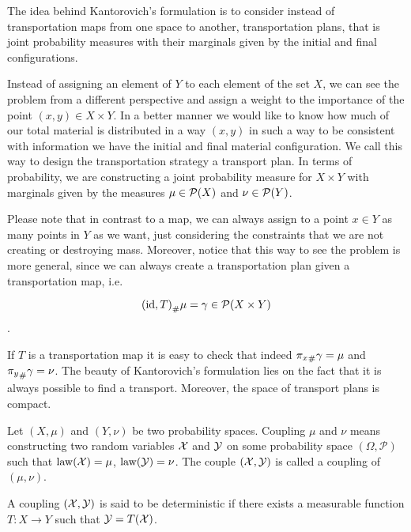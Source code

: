 The idea behind Kantorovich's formulation is to consider instead of transportation maps from one space to another, transportation plans, that is joint probability measures with their marginals given by the initial and final configurations.

Instead of assigning an element of $Y$ to each element of the set $X$, we can see the problem from a different perspective and assign a weight to the importance of the point $\left(x, y\right)\in X\times Y$. In a better manner we would like to know how much of our total material is distributed in a way $(x, y)$ in such a way to be consistent with information we have the initial and final material configuration. We call this way to design the transportation strategy a transport plan. In terms of probability, we are constructing a joint probability measure for $X\times Y$ with marginals given by the measures $\mu \in \mathcal{P}(X)$ and $\nu \in \mathcal{P}(Y)$.

Please note that in contrast to a map, we can always assign to a point $x\in Y$ as many points in $Y$ as we want, just considering the constraints that we are not creating or destroying mass. Moreover, notice that this way to see the problem is more general, since we can always create a transportation plan given a transportation map, i.e. 

\begin{equation*}
	{(\mathrm{id}, T)}_{\#} \mu=\gamma \in \mathcal{P}(X\times Y)
\end{equation*}. 

If $T$ is a transportation map it is easy to check that indeed ${\pi_x}_{\#} \gamma=\mu$ and ${\pi_y}_{\#} \gamma=\nu$. The beauty of Kantorovich's formulation lies on the fact that it is always possible to find a transport. Moreover, the space of transport plans is compact. 

\begin{definition}[Coupling] Let $(X, \mu)$ and $(Y, \nu)$ be two probability spaces. Coupling $\mu$ and $\nu$ means constructing two random variables $\mathcal{X}$ and $\mathcal{Y}$ on some probability space $(\Omega, \mathcal{P})$ such that $\mathrm{law}(\mathcal{X})=\mu$, $\mathrm{law}(\mathcal{Y})=\nu$. The couple $(\mathcal{X},\mathcal{Y})$ is called a coupling of $(\mu, \nu)$.  
\end{definition}

\begin{definition}
A coupling $(\mathcal{X},\mathcal{Y})$ is said to be deterministic if there exists a measurable function $T: X \rightarrow Y$ such that $\mathcal{Y} = T(\mathcal{X})$.
\end{definition}

